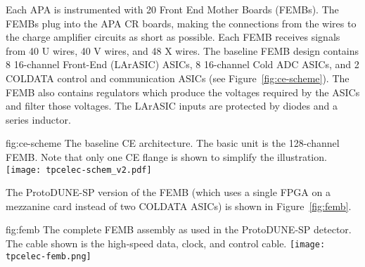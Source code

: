 Each APA is instrumented with 20 Front End Mother Boards (FEMBs).
The FEMBs plug into the APA CR boards, making the connections from the wires to the charge amplifier circuits as short as possible.
Each FEMB receives signals from 40 U wires, 40 V wires, and 48 X wires.
The baseline FEMB design contains 8 16-channel Front-End (LArASIC) ASICs, 8 16-channel Cold ADC ASICs, and 2 COLDATA control and communication ASICs (see Figure~\ref{fig:ce-scheme}).
The FEMB also contains regulators which produce the voltages required by the ASICs and 
filter those voltages.
The LArASIC inputs are protected by diodes and a series inductor.

\begin{dunefigure}
{fig:ce-scheme}
{The baseline CE architecture. The basic unit is the 128-channel FEMB. Note that only one CE flange is shown to simplify the illustration.}
\texttt{[image: tpcelec-schem\_v2.pdf]}
\end{dunefigure}

The ProtoDUNE-SP version of the FEMB (which uses a single FPGA on a mezzanine card instead of two COLDATA ASICs) is shown in Figure~\ref{fig:femb}.

\begin{dunefigure}
{fig:femb}
{The complete FEMB assembly as used in the ProtoDUNE-SP detector. The cable shown is the high-speed data, clock, and control cable.}
\texttt{[image: tpcelec-femb.png]}
\end{dunefigure}
